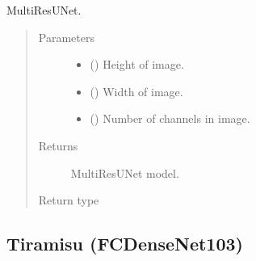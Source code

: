 \documentclass[letterpaper,10pt,english]{sphinxmanual}
\begin{document}
\begin{fulllineitems}
\label{\detokenize{models/multiresunet:models.multiresunet.MultiResUnet}}
MultiResUNet.
\begin{quote}\begin{description}
\item[{Parameters}] \leavevmode\begin{itemize}
\item {} 
 () \textendash{} Height of image.

\item {} 
 () \textendash{} Width of image.

\item {} 
 () \textendash{} Number of channels in image.

\end{itemize}

\item[{Returns}] \leavevmode
{} \textendash{} MultiResUNet model.

\item[{Return type}] \leavevmode
{}

\end{description}\end{quote}

\end{fulllineitems}



\subsection{Tiramisu (FC\sphinxhyphen{}DenseNet103)}
\label{\detokenize{models/tiramisu:module-models.tiramisu}}\label{\detokenize{models/tiramisu:tiramisu-fc-densenet103}}\label{\detokenize{models/tiramisu::doc}}
\end{document}
